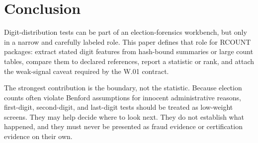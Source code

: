\section{Conclusion}

Digit-distribution tests can be part of an election-forensics workbench, but
only in a narrow and carefully labeled role. This paper defines that role for
RCOUNT packages: extract stated digit features from hash-bound summaries or
large count tables, compare them to declared references, report a statistic or
rank, and attach the weak-signal caveat required by the W.01 contract.

The strongest contribution is the boundary, not the statistic. Because election
counts often violate Benford assumptions for innocent administrative reasons,
first-digit, second-digit, and last-digit tests should be treated as low-weight
screens. They may help decide where to look next. They do not establish what
happened, and they must never be presented as fraud evidence or certification
evidence on their own.
